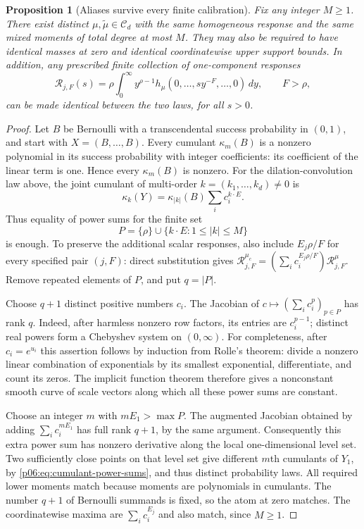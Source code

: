 \documentclass[11pt,letterpaper]{article}
\newtheorem{proposition}[theorem]{Proposition}
\theoremstyle{definition}
\theoremstyle{remark}
\newcommand{\1}{\mathbf 1}
\begin{document}
\begin{proposition}[Aliases survive every finite calibration]
\label{p06:prop:finite-calibration-alias}
Fix any integer $M\ge1$. There exist distinct $\mu,\widetilde\mu\in
\mathcal C_d$ with the same homogeneous response and the same mixed
moments of total degree at most $M$. They may also be required to have
identical masses at zero and identical coordinatewise upper support
bounds. In addition, any prescribed finite collection of one-component
responses
\[
 \mathcal R_{j,F}(s)=\rho\int_0^\infty y^{\rho-1}
 h_\mu(0,\ldots,sy^{-F},\ldots,0)\,dy,
 \qquad F>\rho,
\]
can be made identical between the two laws, for all $s>0$.
\end{proposition}
\begin{proof}
Let $B$ be Bernoulli with a transcendental success probability in $(0,1)$,
and start with $X=(B,\ldots,B)$. Every cumulant $\kappa_m(B)$ is a nonzero
polynomial in its success probability with integer coefficients: its
coefficient of the linear term is one. Hence every $\kappa_m(B)$ is nonzero.
For the dilation-convolution law above, the joint cumulant of multi-order
$k=(k_1,\ldots,k_d)\ne0$ is
\begin{equation}\label{p06:eq:cumulant-power-sums}
 \kappa_k(Y)=\kappa_{|k|}(B)
 \sum_i c_i^{k\cdot E}.
\end{equation}
Thus equality of power sums for the finite set
\[
 P=\{\rho\}\cup\{k\cdot E:1\le |k|\le M\}
\]
is enough. To preserve the additional scalar responses, also include
$E_j\rho/F$ for every specified pair $(j,F)$: direct substitution gives
$\mathcal R_{j,F}^{\mu_c}=(\sum_i c_i^{E_j\rho/F})\mathcal R_{j,F}^{\mu}$.
Remove repeated elements of $P$, and put $q=|P|$.

Choose $q+1$ distinct positive numbers $c_i$. The Jacobian of
$c\mapsto(\sum_i c_i^p)_{p\in P}$ has rank $q$.
Indeed, after harmless nonzero row factors, its entries are $c_i^{p-1}$;
distinct real powers form a Chebyshev system on $(0,\infty)$.
For completeness, after $c_i=e^{u_i}$ this assertion follows by induction
from Rolle's theorem: divide a nonzero linear combination of exponentials
by its smallest exponential, differentiate, and count its zeros.
The implicit function theorem therefore gives a nonconstant smooth curve
of scale vectors along which all these power sums are constant.

Choose an integer $m$ with $mE_1>\max P$. The augmented Jacobian obtained
by adding $\sum_i c_i^{mE_1}$ has full rank $q+1$, by the same argument.
Consequently this extra power sum has nonzero derivative along the local
one-dimensional level set. Two sufficiently close points on that level
set give different $m$th cumulants of $Y_1$, by
\eqref{p06:eq:cumulant-power-sums}, and thus distinct probability laws.
All required lower moments match because moments are polynomials in
cumulants. The number $q+1$ of Bernoulli summands is fixed, so the atom at
zero matches. The coordinatewise maxima are $\sum_i c_i^{E_j}$ and also
match, since $M\ge1$.
\end{proof}
\end{document}
